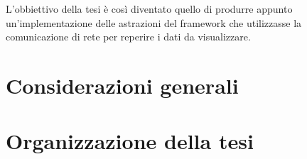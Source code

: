 L'obbiettivo della tesi è così diventato quello di produrre appunto un'implementazione delle astrazioni del framework che utilizzasse la comunicazione di rete per reperire i dati da visualizzare.


\section{Considerazioni generali}
\label{sec:considerazioni}


\section{Organizzazione della tesi}
\label{sec:orgtesi}
